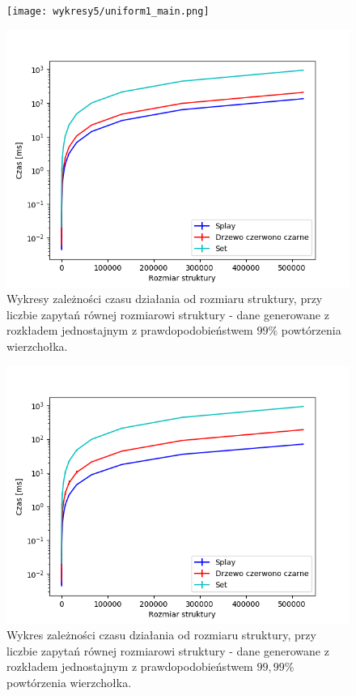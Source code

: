 \documentclass[declaration,shortabstract]{iithesis}
\theoremstyle{thm}
\theoremstyle{remark}
\theoremstyle{plain}
\theoremstyle{plain}
\theoremstyle{plain}
\begin{document}
\begin{figure}[H]
\begin{minipage}[b]{.45\textwidth}
\centering
\texttt{[image: wykresy5/uniform1\_main.png]}
\end{minipage}
\hfill
\begin{minipage}[b]{.45\textwidth}
\centering
\includegraphics[width=1\textwidth]{wykresy3/uniform1_main.png}
\end{minipage}
\caption{Wykresy zależności czasu działania od rozmiaru struktury, przy liczbie zapytań równej rozmiarowi struktury - dane generowane z rozkładem jednostajnym z prawdopodobieństwem  \(99\%\) powtórzenia wierzchołka.}
\end{figure}

\begin{figure}[H]  
\centering
    \includegraphics[scale=0.45]{wykresy3/uniform001_main.png}
      \caption{Wykres zależności czasu działania od rozmiaru struktury, przy liczbie zapytań równej rozmiarowi struktury - dane generowane z rozkładem jednostajnym z prawdopodobieństwem  \(99,99\%\) powtórzenia wierzchołka.}  
\end{figure}
\end{document}
